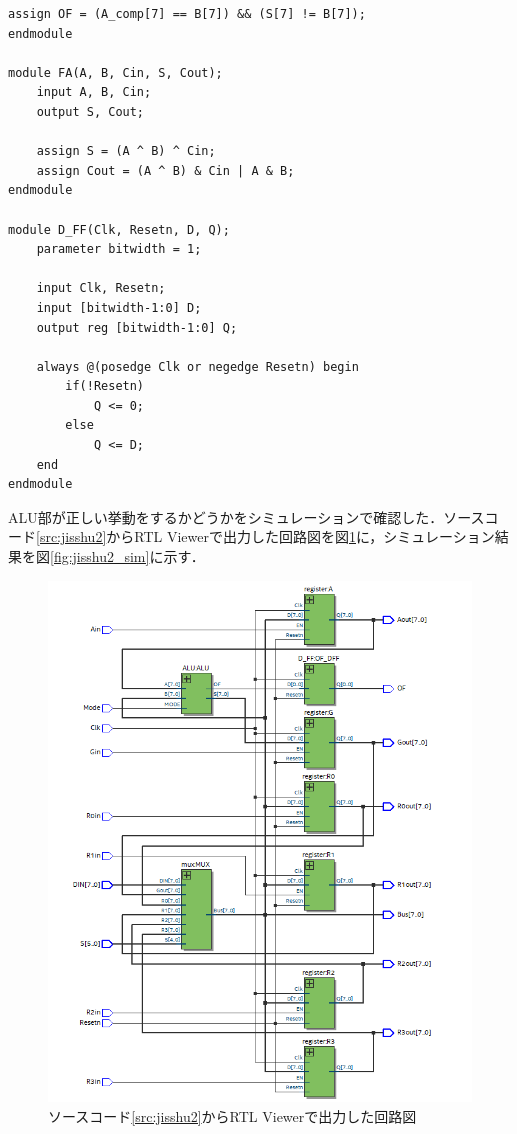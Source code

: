 \documentclass{jlreq}
\numberwithin{equation}{section}
\begin{document}
\begin{lstlisting}[caption={実習2のモジュール}, label={src:jisshu2}]
	assign OF = (A_comp[7] == B[7]) && (S[7] != B[7]);
endmodule

module FA(A, B, Cin, S, Cout);
	input A, B, Cin;
	output S, Cout;
	
	assign S = (A ^ B) ^ Cin;
	assign Cout = (A ^ B) & Cin | A & B;
endmodule

module D_FF(Clk, Resetn, D, Q);
	parameter bitwidth = 1;
	
	input Clk, Resetn;
	input [bitwidth-1:0] D;
	output reg [bitwidth-1:0] Q;
	
	always @(posedge Clk or negedge Resetn) begin
		if(!Resetn)
			Q <= 0;
		else
			Q <= D;
	end
endmodule
\end{lstlisting}

ALU部が正しい挙動をするかどうかをシミュレーションで確認した．ソースコード\ref{src:jisshu2}からRTL Viewerで出力した回路図を図\ref{fig:jisshu2_RTL}に，シミュレーション結果を図\ref{fig:jisshu2_sim}に示す．
\begin{figure}[H]
	\centering
	\includegraphics[width=\textwidth]{assets/jisshu2_RTL.png}
	\caption{ソースコード\ref{src:jisshu2}からRTL Viewerで出力した回路図}
	\label{fig:jisshu2_RTL}
\end{figure}
\end{document}
